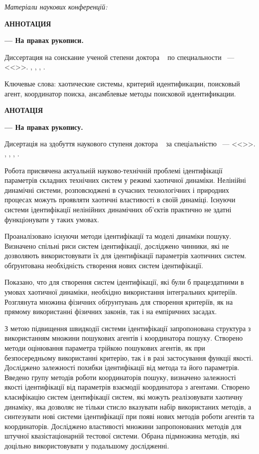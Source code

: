 \documentclass[a4paper,13pt]{atuaref}
\newcommand{\xsect}[1]{\medskip\begin{center}\textbf{#1}\end{center}\medskip\penalty10000}
\newcommand{\xxxsect}[1]{\smallskip\textit{#1}\smallskip\penalty10000}
\begin{document}
\xxxsect{Матеріали наукових конференцій:}

\printbibliography[heading=none, keyword=confer]



\xsect{АННОТАЦИЯ}

\textbf{\dissauthorRu}
\textbf{\booknameRu}
\textbf{--- На правах рукописи.}

Диссертация на соискание ученой степени
доктора
\dissScopeRu\ {}
по специальности
\dissSpecId\ --- <<\dissSpecRu>>.
\institutionRu, \belongRu, \cityRu, \bookyear.


Ключевые слова:
хаотические системы,
критерий идентификации,
поисковый агент,
координатор поиска,
ансамблевые методы поисковой идентификации.


\xsect{АНОТАЦІЯ}

\textbf{\dissauthorUa}
\textbf{\booknameUa}
\textbf{--- На правах рукопису.}

Дисертація на здобуття наукового ступеня
доктора
\dissScopeUa\ {}
за спеціальністю
\dissSpecId\ --- <<\dissSpecUa>>.
\institutionUa, \belongUa, \cityUa, \bookyear.


Робота присвячена актуальній науково-технічній проблемі
ідентифікації параметрів складних технічних систем у режимі хаотичної динаміки.
Нелінійні динамічні системи, розповсюджені в сучасних технологічних і
природних процесах можуть проявляти хаотичні властивості в своїй динаміці.
Існуючи системи ідентифікації нелінійних динамічних об'єктів практично не
здатні функціонувати у таких умовах.

Проаналізовано існуючи методи ідентифікації та моделі динаміки пошуку.
Визначено спільні риси систем ідентифікації,
досліджено чинники, які не дозволяють використовувати їх
для ідентифікації параметрів хаотичних систем. обґрунтована необхідність
створення нових систем ідентифікації.

Показано, что для створення систем ідентифікації, які були б працездатними
в умовах хаотичної динаміки, необхідно використання інтегральних критеріїв.
Розглянута множина фізичних обґрунтувань для створення критеріїв,
як на прямому використанні фізичних законів, так і на емпіричних засадах.

З метою підвищення швидкодії системи ідентифікації запропонована
структура з використанням множини пошукових агентів і координатора пошуку.
Створено методи оцінювання параметра трійкою пошукових агентів, як
при безпосередньому використанні критерію, так і в разі застосування функції якості.
Досліджено залежності похибки ідентифікації від метода та його параметрів.
Введено групу методів роботи координаторів пошуку,
визначено залежності якості ідентифікації від параметрів взаємодії
координатора з агентами.
Створено класифікацію систем ідентифікації систем, які можуть реалізовувати хаотичну динаміку,
яка дозволяє не тільки стисло вказувати набір використаних методів,
а синтезувати нові системи ідентифікації при появі нових методів роботи агентів та координаторів.
Досліджено властивості множини запропонованих методів для штучної
квазістаціонарній тестової системи. Обрана підмножина методів, які доцільно
використовувати у подальшому дослідженні.
\end{document}
